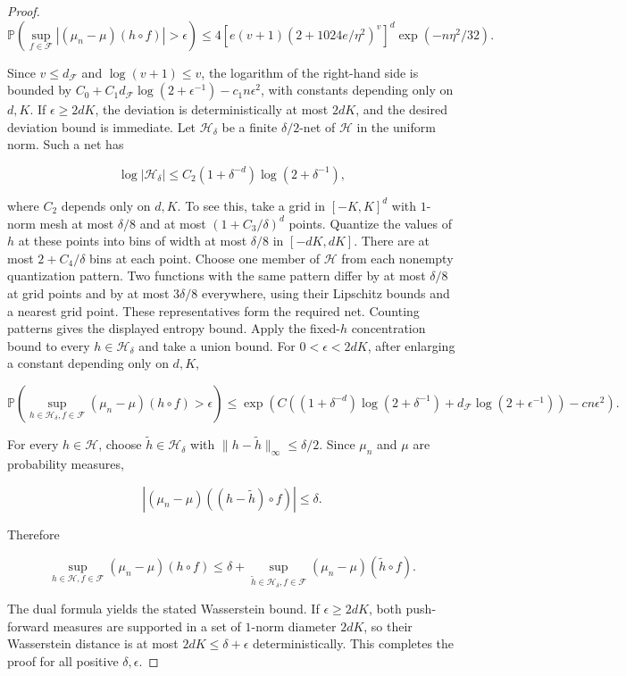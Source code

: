 \begin{proof}
\[
\mathbb P\left(\sup_{f\in\mathcal F}|(\mu_n-\mu)(h\circ f)|>\epsilon\right)
\leqslant4\left[e(v+1)(2+1024e/\eta^2)^v\right]^d\exp(-n\eta^2/32).
\]

Since $v\leqslant d_{\mathcal F}$ and $\log(v+1)\leqslant v$, the logarithm of the right-hand side is bounded by $C_0+C_1d_{\mathcal F}\log(2+\epsilon^{-1})-c_1n\epsilon^2$, with constants depending only on $d,K$. If $\epsilon\geqslant2dK$, the deviation is deterministically at most $2dK$, and the desired deviation bound is immediate.
Let $\mathcal H_\delta$ be a finite $\delta/2$-net of $\mathcal H$ in the uniform norm. Such a net has

\[
\log|\mathcal H_\delta|\leqslant C_2(1+\delta^{-d})\log(2+\delta^{-1}),
\]

where $C_2$ depends only on $d,K$. To see this, take a grid in $[-K,K]^d$ with $1$-norm mesh at most $\delta/8$ and at most $(1+C_3/\delta)^d$ points. Quantize the values of $h$ at these points into bins of width at most $\delta/8$ in $[-dK,dK]$. There are at most $2+C_4/\delta$ bins at each point. Choose one member of $\mathcal H$ from each nonempty quantization pattern. Two functions with the same pattern differ by at most $\delta/8$ at grid points and by at most $3\delta/8$ everywhere, using their Lipschitz bounds and a nearest grid point. These representatives form the required net. Counting patterns gives the displayed entropy bound. Apply the fixed-$h$ concentration bound to every $h\in\mathcal H_\delta$ and take a union bound. For $0<\epsilon<2dK$, after enlarging a constant depending only on $d,K$,

\[
\mathbb P\left(\sup_{h\in\mathcal H_\delta,f\in\mathcal F}(\mu_n-\mu)(h\circ f)>\epsilon\right)
\leqslant\exp\left(C\left((1+\delta^{-d})\log(2+\delta^{-1})+d_{\mathcal F}\log(2+\epsilon^{-1})\right)-cn\epsilon^2\right).
\]

For every $h\in\mathcal H$, choose $\tilde h\in\mathcal H_\delta$ with $\|h-\tilde h\|_\infty\leqslant\delta/2$. Since $\mu_n$ and $\mu$ are probability measures,

\[
|(\mu_n-\mu)((h-\tilde h)\circ f)|\leqslant\delta.
\]

Therefore

\[
\sup_{h\in\mathcal H,f\in\mathcal F}(\mu_n-\mu)(h\circ f)
\leqslant\delta+\sup_{\tilde h\in\mathcal H_\delta,f\in\mathcal F}(\mu_n-\mu)(\tilde h\circ f).
\]

The dual formula yields the stated Wasserstein bound. If $\epsilon\geqslant2dK$, both push-forward measures are supported in a set of $1$-norm diameter $2dK$, so their Wasserstein distance is at most $2dK\leqslant\delta+\epsilon$ deterministically. This completes the proof for all positive $\delta,\epsilon$.
\end{proof}

